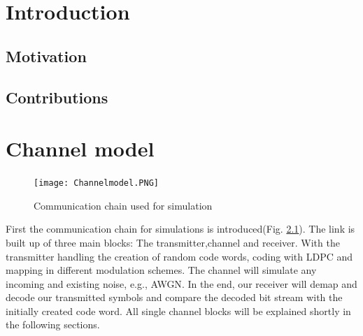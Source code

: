 \documentclass[12pt,oneside, draft]{report}
\begin{document}


\tableofcontents

\newpage
\setlength{\baselineskip}{3ex}

\begin{spacing}{1.15}
\end{spacing}
\newpage
\thispagestyle{empty}
\null

\newpage
{}
\listoffigures

%

\newpage
\thispagestyle{empty}
\null
\newpage
\chapter{Introduction}
\section{Motivation}
\section{Contributions}

\newpage
\chapter{Channel model}
\label{sec:channelmodel}
\begin{figure}[H]
	\centering
	\texttt{[image: Channelmodel.PNG]}
	\caption{Communication chain used for simulation}
	\label{fig:Channelmodel}
\end{figure}
First the communication chain for simulations is introduced(Fig. \ref{fig:Channelmodel}).
The link is built up of three main blocks: The transmitter,channel and receiver. With the transmitter handling the creation of random code words, coding with \gls{LDPC} and mapping in different modulation schemes. The channel will simulate any incoming and existing noise, e.g., \gls{AWGN}. In the end, our receiver will demap and decode our transmitted symbols and compare the decoded bit stream with the initially created code word.
\newline
All single channel blocks will be explained shortly in the following sections.
\end{document}
